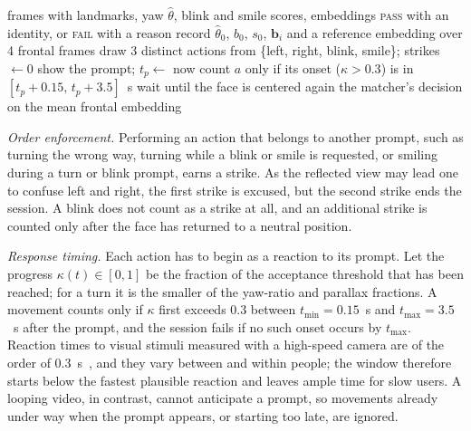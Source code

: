 \documentclass[journal]{IEEEtran}
\begin{document}
\begin{algorithm}[!t]
\caption{Face-unlock liveness session}\label{alg:live}
\footnotesize
\begin{algorithmic}[1]
\Require frames with landmarks, yaw $\hat\theta$, blink and smile scores, embeddings
\Ensure \textsc{pass} with an identity, or \textsc{fail} with a reason
\State record $\hat\theta_0$, $b_0$, $s_0$, $\mathbf{b}_i$ and a reference embedding over 4 frontal frames
\State draw 3 distinct actions from \{left, right, blink, smile\}; strikes $\gets 0$
  \State show the prompt; $t_p\gets$ now
  \Repeat
    \State count $a$ only if its onset ($\kappa>0.3$) is in $[t_p{+}0.15,\,t_p{+}3.5]$~s
  \State wait until the face is centered again
\EndFor
\State \Return the matcher's decision on the mean frontal embedding
\end{algorithmic}
\end{algorithm}

\emph{Order enforcement.} Performing an action that belongs to another prompt, such as turning the wrong way, turning while a blink or smile is requested, or smiling during a turn or blink prompt, earns a strike. As the reflected view may lead one to confuse left and right, the first strike is excused, but the second strike ends the session. A blink does not count as a strike at all, and an additional strike is counted only after the face has returned to a neutral position.

\emph{Response timing.} Each action has to begin as a reaction to its prompt. Let the progress $\kappa(t)\in[0,1]$ be the fraction of the acceptance threshold that has been reached; for a turn it is the smaller of the yaw-ratio and parallax fractions. A movement counts only if $\kappa$ first exceeds 0.3 between $t_{\min}=0.15$~s and $t_{\max}=3.5$~s after the prompt, and the session fails if no such onset occurs by $t_{\max}$. Reaction times to visual stimuli measured with a high-speed camera are of the order of 0.3~s~\cite{tatsuno2016reaction}, and they vary between and within people; the window therefore starts below the fastest plausible reaction and leaves ample time for slow users. A looping video, in contrast, cannot anticipate a prompt, so movements already under way when the prompt appears, or starting too late, are ignored.
\end{document}
